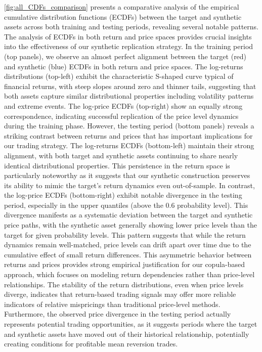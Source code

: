 \cref{fig:all_CDFs_comparison} presents a comparative analysis of the empirical cumulative distribution functions (ECDFs) between the target and synthetic assets across both training and testing periods, revealing several notable patterns. The analysis of ECDFs in both return and price spaces provides crucial insights into the effectiveness of our synthetic replication strategy.
In the training period (top panels), we observe an almost perfect alignment between the target (red) and synthetic (blue) ECDFs in both return and price spaces. The log-returns distributions (top-left) exhibit the characteristic S-shaped curve typical of financial returns, with steep slopes around zero and thinner tails, suggesting that both assets capture similar distributional properties including volatility patterns and extreme events. The log-price ECDFs (top-right) show an equally strong correspondence, indicating successful replication of the price level dynamics during the training phase.
However, the testing period (bottom panels) reveals a striking contrast between returns and prices that has important implications for our trading strategy. The log-returns ECDFs (bottom-left) maintain their strong alignment, with both target and synthetic assets continuing to share nearly identical distributional properties. This persistence in the return space is particularly noteworthy as it suggests that our synthetic construction preserves its ability to mimic the target's return dynamics even out-of-sample.
In contrast, the log-price ECDFs (bottom-right) exhibit notable divergence in the testing period, especially in the upper quantiles (above the 0.6 probability level). This divergence manifests as a systematic deviation between the target and synthetic price paths, with the synthetic asset generally showing lower price levels than the target for given probability levels. This pattern suggests that while the return dynamics remain well-matched, price levels can drift apart over time due to the cumulative effect of small return differences.
This asymmetric behavior between returns and prices provides strong empirical justification for our copula-based approach, which focuses on modeling return dependencies rather than price-level relationships. The stability of the return distributions, even when price levels diverge, indicates that return-based trading signals may offer more reliable indicators of relative mispricings than traditional price-level methods. Furthermore, the observed price divergence in the testing period actually represents potential trading opportunities, as it suggests periods where the target and synthetic assets have moved out of their historical relationship, potentially creating conditions for profitable mean reversion trades.

